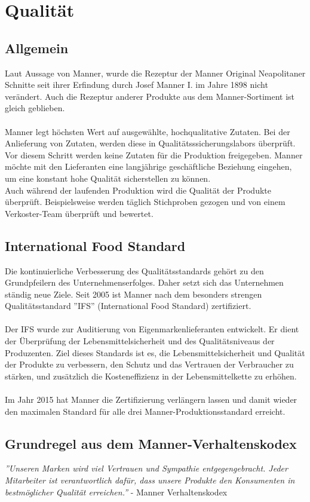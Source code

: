 \section{Qualität}
\subsection{Allgemein}
Laut Aussage von Manner, wurde die Rezeptur der Manner Original Neapolitaner Schnitte seit ihrer Erfindung durch Josef Manner I. im Jahre 1898 nicht verändert. Auch die Rezeptur anderer Produkte aus dem Manner-Sortiment ist gleich geblieben. \cite{josef_manner_unternehmen} \\\\
\noindent
Manner legt höchsten Wert auf ausgewählte, hochqualitative Zutaten. Bei der Anlieferung von Zutaten, werden diese in Qualitätsssicherungslabors überprüft. Vor diesem Schritt werden keine Zutaten für die Produktion freigegeben. Manner möchte mit den Lieferanten eine langjährige geschäftliche Beziehung eingehen, um eine konstant hohe Qualität sicherstellen zu können. \cite{josef_manner_unternehmen} \\
Auch während der laufenden Produktion wird die Qualität der Produkte überprüft. Beispielsweise werden täglich Stichproben gezogen und von einem Verkoster-Team überprüft und bewertet. \cite{josef_manner_unternehmen}
\subsection{International Food Standard}
Die kontinuierliche Verbesserung des Qualitätsstandards gehört zu den Grundpfeilern des Unternehmenserfolges. Daher setzt sich das Unternehmen ständig neue Ziele. Seit 2005 ist Manner nach dem besonders strengen Qualitätsstandard ''IFS'' (International Food Standard) zertifiziert.\cite{josef_manner_unternehmen}\\\\
\noindent
Der IFS wurde zur Auditierung von Eigenmarkenlieferanten entwickelt. Er dient der Überprüfung der Lebensmittelsicherheit und des Qualitätsniveaus der Produzenten. Ziel dieses Standards ist es, die Lebensmittelsicherheit und Qualität der Produkte zu verbessern, den Schutz und das Vertrauen der Verbraucher zu stärken, und zusätzlich die Kosteneffizienz in der Lebensmittelkette zu erhöhen. \cite{qualityaustria_ifs}\\\\
Im Jahr 2015 hat Manner die Zertifizierung verlängern lassen und damit wieder den maximalen Standard für alle drei Manner-Produktionsstandard erreicht.
\subsection{Grundregel aus dem Manner-Verhaltenskodex}

\textit{''Unseren Marken wird viel Vertrauen und Sympathie entgegengebracht. Jeder Mitarbeiter ist verantwortlich dafür, dass unsere Produkte den Konsumenten in bestmöglicher Qualität erreichen.''} - Manner Verhaltenskodex \cite{josef_manner_unternehmen}